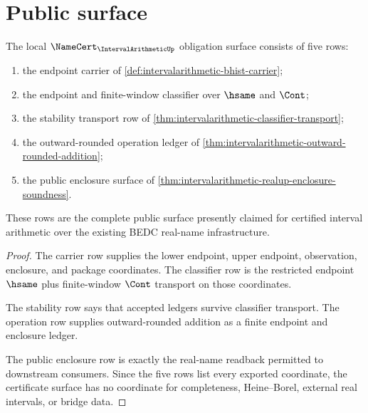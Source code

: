 \section{Public surface}
\label{sec:intervalarithmetic-public-surface}

\begin{theorem}
\label{thm:intervalarithmetic-public-certificate-surface}
The local $\NameCert_{\IntervalArithmeticUp}$ obligation surface consists of five rows:
\begin{enumerate}
\item the endpoint carrier of \autoref{def:intervalarithmetic-bhist-carrier};
\item the endpoint and finite-window classifier over $\hsame$ and $\Cont$;
\item the stability transport row of \autoref{thm:intervalarithmetic-classifier-transport};
\item the outward-rounded operation ledger of \autoref{thm:intervalarithmetic-outward-rounded-addition};
\item the public enclosure surface of \autoref{thm:intervalarithmetic-realup-enclosure-soundness}.
\end{enumerate}
These rows are the complete public surface presently claimed for certified interval arithmetic over the existing BEDC real-name infrastructure.
\end{theorem}
\begin{proof}
The carrier row supplies the lower endpoint, upper endpoint, observation, enclosure, and package coordinates. The classifier row is the restricted endpoint $\hsame$ plus finite-window $\Cont$ transport on those coordinates.

The stability row says that accepted ledgers survive classifier transport. The operation row supplies outward-rounded addition as a finite endpoint and enclosure ledger.

The public enclosure row is exactly the real-name readback permitted to downstream consumers. Since the five rows list every exported coordinate, the certificate surface has no coordinate for completeness, Heine--Borel, external real intervals, or bridge data.
\end{proof}


